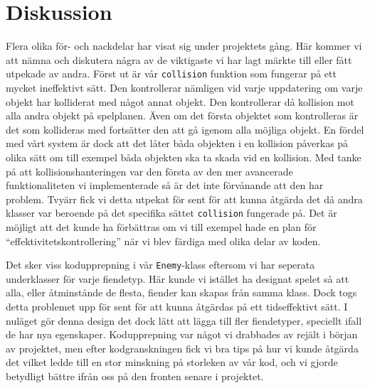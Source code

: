 \documentclass{TDP003mall}
\begin{document}
\section{Diskussion}
Flera olika för- och nackdelar har visat sig under projektets gång. 
Här kommer vi att nämna och diskutera några av de viktigaste vi har lagt märkte till eller fått utpekade av andra. 
Först ut är vår \texttt{collision} funktion som fungerar på ett mycket ineffektivt sätt. 
Den kontrollerar nämligen vid varje uppdatering om varje objekt har kolliderat med något annat objekt. 
Den kontrollerar då kollision mot alla andra objekt på spelplanen. 
Även om det första objektet som kontrolleras är det som kollideras med fortsätter den att gå igenom alla möjliga objekt. 
En fördel med vårt system är dock att det låter båda objekten i en kollision påverkas på olika sätt om till exempel båda objekten ska ta skada vid en kollision.
Med tanke på att kollisionshanteringen var den första av den mer avancerade funktionaliteten vi implementerade så är det inte förvånande att den har problem. 
Tvyärr fick vi detta utpekat för sent för att kunna åtgärda det då andra klasser var beroende på det specifika sättet \texttt{collision} fungerade på. 
Det är möjligt att det kunde ha förbättras om vi till exempel hade en plan för ``effektivitetskontrollering'' när vi blev färdiga med olika delar av koden.

Det sker viss kodupprepning i vår \texttt{Enemy}-klass eftersom vi har seperata underklasser för varje fiendetyp. 
Här kunde vi istället ha designat spelet så att alla, eller åtminstånde de flesta, fiender kan skapas från samma klass. 
Dock togs detta problemet upp för sent för att kunna åtgärdas på ett tidseffektivt sätt. 
I nuläget gör denna design det dock lätt att lägga till fler fiendetyper, speciellt ifall de har nya egenskaper.
Kodupprepning var något vi drabbades av rejält i början av projektet, men efter kodgranskningen fick vi bra tips på hur vi kunde åtgärda det vilket ledde till en stor minskning på storleken av vår kod, 
och vi gjorde betydligt bättre ifrån oss på den fronten senare i projektet.
\end{document}
